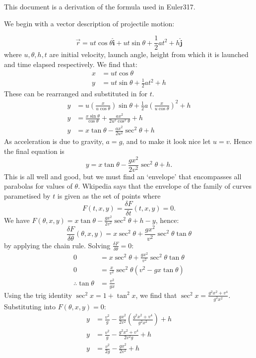 \documentclass[a4paper,12pt]{article}
\newcommand{\ivec}{\mathbf{\hat{i}}}
\newcommand{\jvec}{\mathbf{\hat{j}}}
\begin{document}
This document is a derivation of the formula used in Euler317.

We begin with a vector description of projectile motion:
   
\[\vec{r} = u t\cos\theta \ivec + ut\sin\theta + \frac{1}{2}at^2 + h \jvec\]
where \(u, \theta, h, t\) are initial velocity, launch angle, height from which it is launched and time elapsed respectively.
We find that:
\begin{align}
    x &= u t\cos\theta \\
    y &= ut\sin\theta + \frac{1}{2}at^2 + h 
\end{align}
These can be rearranged and substituted in for \(t\).
\begin{align*}
    y &= u\left(\frac{x}{u\cos\theta}\right)\sin\theta + \frac{1}{2}a\left(\frac{x}{u\cos\theta}\right)^2 + h \\
    y &= \frac{x\sin\theta}{\cos\theta} + \frac{ax^2}{2 u^2 \cos^2\theta} + h \\
    y &= x \tan \theta - \frac{ax^2}{2u^2}\sec^2 \theta + h
\end{align*}
As acceleration is due to gravity, \(a = g\), and to make it look nice let \(u = v\).
Hence the final equation is
\[y = x \tan \theta - \frac{gx^2}{2v^2}\sec^2 \theta + h.\]
This is all well and good, but we must find an `envelope' that encompasses all parabolas for values of \(\theta\).
Wkipedia says that the envelope of the family of curves parametised by \(t\) is given as the set of points where 
\[F(t,x,y) = \frac{\delta F}{\delta t}(t,x,y) = 0.\]
We have \(F(\theta,x,y) = x \tan \theta - \frac{gx^2}{2v^2}\sec^2 \theta + h-y\), hence:
\[
    \frac{\delta F}{\delta \theta}(\theta,x,y) = x \sec^2 \theta + \frac{gx^2}{v^2}\sec^2\theta\tan \theta 
\]
by applying the chain rule. Solving \(\frac{\delta F}{\delta \theta} = 0\):
\begin{align*}
    0 &= x \sec^2 \theta + \frac{gx^2}{v^2}\sec^2\theta\tan \theta \\
    0 &= \frac{x}{v^2}\sec^2 \theta \left(v^2 - gx\tan \theta\right) \\
    \therefore \tan \theta &= \frac{v^2}{gx}
\end{align*}
Using the trig identity \(\sec^2x = 1 + \tan^2 x\), we find that \(\sec^2x = \frac{g^2x^2+v^4}{g^2x^2}\).
Substituting into \(F(\theta,x,y) = 0\):
\begin{align}
    y &= \frac{v^2}{g} -\frac{gx^2}{2v^2}\left(\frac{g^2x^2+v^4}{g^2x^2}\right) + h \nonumber\\
    y  &= \frac{v^2}{g} - \frac{g^2x^2+v^4}{2v^2g} + h\nonumber\\
    y  &= \frac{v^2}{2g} - \frac{gx^2}{2v^2} +h \label{eq:envelope}
\end{align}
\end{document}
